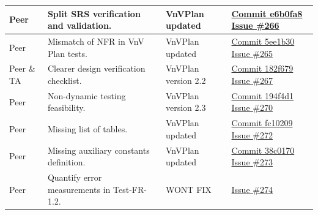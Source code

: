 \documentclass{article}
\begin{document}
\begin{longtable}{|p{2cm}|p{4.5cm}|p{3.5cm}|p{3cm}|}
    Peer &
    Split SRS verification and validation. &
    VnVPlan updated & 
    \href{https://github.com/Team6-SixSense/audio360/commit/e6b0fa8}{Commit
        e6b0fa8}
    \newline
    \href{https://github.com/Team6-SixSense/audio360/issues/266}{Issue \#266} \\
    \hline

    Peer &
    Mismatch of NFR in VnV Plan tests. &
    VnVPlan updated & 
    \href{https://github.com/Team6-SixSense/audio360/commit/5ee1b30}{Commit
        5ee1b30}
    \newline
    \href{https://github.com/Team6-SixSense/audio360/issues/265}{Issue \#265} \\
    \hline

    Peer \& TA &
    Clearer design verification checklist. &
    VnVPlan version 2.2 & 
    \href{https://github.com/Team6-SixSense/audio360/commit/182f679}{Commit
        182f679}
    \newline
    \href{https://github.com/Team6-SixSense/audio360/issues/267}{Issue \#267} \\
    \hline

    Peer &
    Non-dynamic testing feasibility. &
    VnVPlan version 2.3 & 
    \href{https://github.com/Team6-SixSense/audio360/commit/194f4d1}{Commit
        194f4d1}
    \newline
    \href{https://github.com/Team6-SixSense/audio360/issues/270}{Issue \#270} \\
    \hline

    Peer &
    Missing list of tables. &
    VnVPlan updated & 
    \href{https://github.com/Team6-SixSense/audio360/commit/fc10209}{Commit
        fc10209}
    \newline
    \href{https://github.com/Team6-SixSense/audio360/issues/272}{Issue \#272} \\
    \hline

    Peer &
    Missing auxiliary constants definition. &
    VnVPlan updated & 
    \href{https://github.com/Team6-SixSense/audio360/commit/38c0170}{Commit
        38c0170}
    \newline
    \href{https://github.com/Team6-SixSense/audio360/issues/273}{Issue \#273} \\
    \hline

    Peer &
    Quantify error measurements in Test-FR-1.2. &
    WONT FIX & 
    \href{https://github.com/Team6-SixSense/audio360/issues/274}{Issue \#274} \\
    \hline


\end{longtable}
\end{document}

